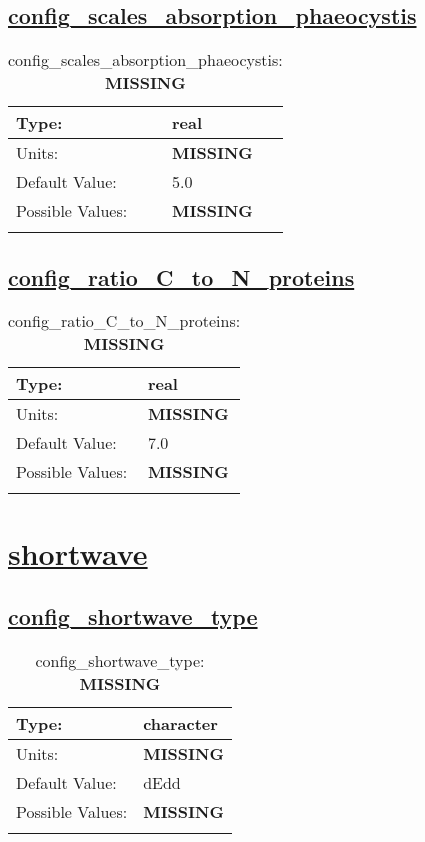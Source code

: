 \subsection[config\_scales\_absorption\_phaeocystis]{\hyperref[sec:nm_tab_biogeochemistry]{config\_scales\_absorption\_phaeocystis}}
\label{subsec:nm_sec_config_scales_absorption_phaeocystis}
\begin{center}
\begin{longtable}{| p{2.0in} || p{4.0in} |}
    \hline
    Type: & real \\
    \hline
    Units: & {\bf \color{red} MISSING} \\
    \hline
    Default Value: & 5.0 \\
    \hline
    Possible Values: & {\bf \color{red} MISSING} \\
    \hline
    \caption{config\_scales\_absorption\_phaeocystis: {\bf \color{red} MISSING}}
\end{longtable}
\end{center}
\subsection[config\_ratio\_C\_to\_N\_proteins]{\hyperref[sec:nm_tab_biogeochemistry]{config\_ratio\_C\_to\_N\_proteins}}
\label{subsec:nm_sec_config_ratio_C_to_N_proteins}
\begin{center}
\begin{longtable}{| p{2.0in} || p{4.0in} |}
    \hline
    Type: & real \\
    \hline
    Units: & {\bf \color{red} MISSING} \\
    \hline
    Default Value: & 7.0 \\
    \hline
    Possible Values: & {\bf \color{red} MISSING} \\
    \hline
    \caption{config\_ratio\_C\_to\_N\_proteins: {\bf \color{red} MISSING}}
\end{longtable}
\end{center}
\section[shortwave]{\hyperref[sec:nm_tab_shortwave]{shortwave}}
\label{sec:nm_sec_shortwave}
\subsection[config\_shortwave\_type]{\hyperref[sec:nm_tab_shortwave]{config\_shortwave\_type}}
\label{subsec:nm_sec_config_shortwave_type}
\begin{center}
\begin{longtable}{| p{2.0in} || p{4.0in} |}
    \hline
    Type: & character \\
    \hline
    Units: & {\bf \color{red} MISSING} \\
    \hline
    Default Value: & dEdd \\
    \hline
    Possible Values: & {\bf \color{red} MISSING} \\
    \hline
    \caption{config\_shortwave\_type: {\bf \color{red} MISSING}}
\end{longtable}
\end{center}
